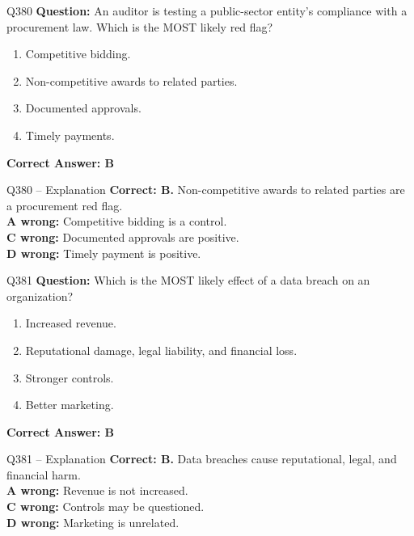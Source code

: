 \documentclass[aspectratio=169,10pt]{beamer}
\begin{document}
	\begin{frame}[t]{Q380}
		\small
		\textbf{Question:} An auditor is testing a public-sector entity's compliance with a procurement law. Which is the MOST likely red flag?
		\begin{enumerate}[label=\Alph*.,itemsep=1pt,topsep=2pt]
			\item Competitive bidding.
			\item Non-competitive awards to related parties.
			\item Documented approvals.
			\item Timely payments.
		\end{enumerate}
		\vspace{4pt}
		\textbf{Correct Answer: B}
	\end{frame}
	
	\begin{frame}[t]{Q380 -- Explanation}
		\small
		\textbf{Correct: B.} Non-competitive awards to related parties are a procurement red flag. \\[4pt]
		\textbf{A wrong:} Competitive bidding is a control. \\[2pt]
		\textbf{C wrong:} Documented approvals are positive. \\[2pt]
		\textbf{D wrong:} Timely payment is positive.
	\end{frame}
	
	\begin{frame}[t]{Q381}
		\small
		\textbf{Question:} Which is the MOST likely effect of a data breach on an organization?
		\begin{enumerate}[label=\Alph*.,itemsep=1pt,topsep=2pt]
			\item Increased revenue.
			\item Reputational damage, legal liability, and financial loss.
			\item Stronger controls.
			\item Better marketing.
		\end{enumerate}
		\vspace{4pt}
		\textbf{Correct Answer: B}
	\end{frame}
	
	\begin{frame}[t]{Q381 -- Explanation}
		\small
		\textbf{Correct: B.} Data breaches cause reputational, legal, and financial harm. \\[4pt]
		\textbf{A wrong:} Revenue is not increased. \\[2pt]
		\textbf{C wrong:} Controls may be questioned. \\[2pt]
		\textbf{D wrong:} Marketing is unrelated.
	\end{frame}
	
\end{document}
